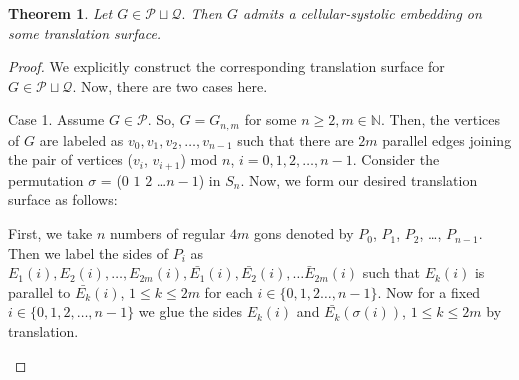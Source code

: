 \documentclass[11pt]{amsart}
\newcommand{\N}{\mathbb{N}}
\theoremstyle{plain}
\newtheorem{theorem}{Theorem}[section]
\theoremstyle{definition}
\theoremstyle{remark}
\numberwithin{equation}{section}
\numberwithin{figure}{section}
\begin{document}
\begin{theorem}
Let $G\in \mathcal{P} \sqcup \mathcal{Q}.$ Then $G$ admits a cellular-systolic embedding on some translation surface.   
\end{theorem}
\begin{proof}
We explicitly construct the corresponding translation surface for $G\in\mathcal{P} \sqcup \mathcal{Q}$.
Now, there are two cases here.

Case 1.
Assume $G\in \mathcal{P}$. So, $G=G_{n,m}$ for some $n\ge 2, m\in \N$. Then, the vertices of $G$ are labeled as $v_0, v_1, v_2, \dots, v_{n-1}$ such that there are $2m$ parallel edges joining the pair of vertices ($v_i$, $v_{i+1}$) mod $n$, $i= 0,1,2, \dots, n-1$. Consider the permutation $\sigma$ = ($0$ $1$ $2$ \dots $n-1$) in $S_n$. Now, we form our desired translation surface as follows:

First, we take $n$ numbers of regular $4m$ gons denoted by $P_0$, $P_1$, $P_2$, \dots, $P_{n-1}$. Then we label the sides of $P_i$ as $E_1(i), E_2(i), \dots, E_{2m}(i), \bar{E_1}(i), \bar{E_2}(i), \dots \bar{E}_{2m}(i)$ such that $E_k(i)$ is parallel to $\bar{E_k}(i)$, $1\leq k\leq 2m$ for each $i\in \{0,1,2 \dots, n-1\}$. Now for a fixed $i\in\{0, 1, 2, \dots, n-1\}$ we glue the sides $E_k(i)$ and $\bar{E_k}(\sigma(i))$, $1\leq k\leq 2m$  by translation. 
\begin{figure}[htbp]
\begin{center}
\end{center}
\end{figure}
\end{proof}
\end{document}
